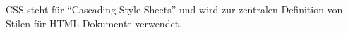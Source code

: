 CSS steht für \enquote{Cascading Style Sheets} und wird zur zentralen Definition von Stilen für HTML-Dokumente verwendet.